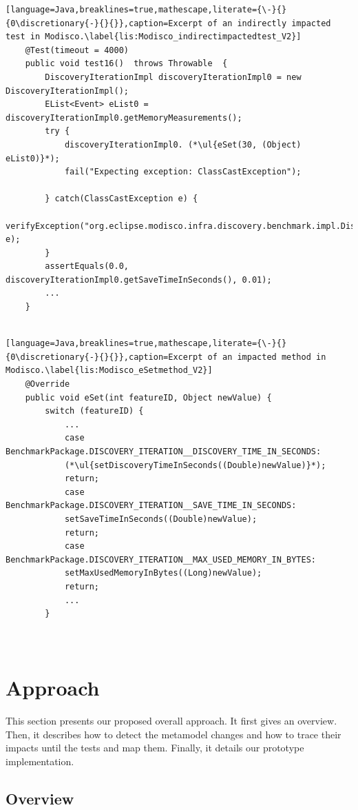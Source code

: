 \begin{lstlisting}[language=Java,breaklines=true,mathescape,literate={\-}{}{0\discretionary{-}{}{}},caption=Excerpt of an indirectly impacted test in Modisco.\label{lis:Modisco_indirectimpactedtest_V2}]
	@Test(timeout = 4000)
	public void test16()  throws Throwable  {
		DiscoveryIterationImpl discoveryIterationImpl0 = new DiscoveryIterationImpl();
		EList<Event> eList0 = discoveryIterationImpl0.getMemoryMeasurements();
		try { 
			discoveryIterationImpl0. (*\ul{eSet(30, (Object) eList0)}*);
			fail("Expecting exception: ClassCastException");
			
		} catch(ClassCastException e) {
			verifyException("org.eclipse.modisco.infra.discovery.benchmark.impl.DiscoveryIterationImpl", e);
		}
		assertEquals(0.0, discoveryIterationImpl0.getSaveTimeInSeconds(), 0.01);
		...
	}
	
\end{lstlisting}



\begin{lstlisting}[language=Java,breaklines=true,mathescape,literate={\-}{}{0\discretionary{-}{}{}},caption=Excerpt of an impacted method in Modisco.\label{lis:Modisco_eSetmethod_V2}]
	@Override
	public void eSet(int featureID, Object newValue) {
		switch (featureID) {
			...
			case BenchmarkPackage.DISCOVERY_ITERATION__DISCOVERY_TIME_IN_SECONDS:
			(*\ul{setDiscoveryTimeInSeconds((Double)newValue)}*);
			return;
			case BenchmarkPackage.DISCOVERY_ITERATION__SAVE_TIME_IN_SECONDS:
			setSaveTimeInSeconds((Double)newValue);
			return;
			case BenchmarkPackage.DISCOVERY_ITERATION__MAX_USED_MEMORY_IN_BYTES:
			setMaxUsedMemoryInBytes((Long)newValue);
			return;
			...
		}
		
		
	\end{lstlisting}
	
\section{Approach}
\label{sec_approach}
This section presents our proposed overall approach. It first gives an overview. Then, it describes how to detect the metamodel changes and how to trace their impacts until the tests and map them. Finally, it details our prototype implementation. 




\subsection{Overview}

